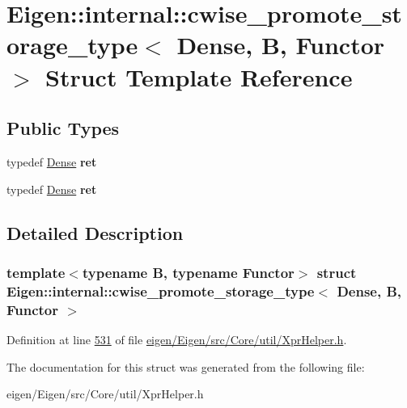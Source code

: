 \hypertarget{struct_eigen_1_1internal_1_1cwise__promote__storage__type_3_01_dense_00_01_b_00_01_functor_01_4}{}\section{Eigen\+:\+:internal\+:\+:cwise\+\_\+promote\+\_\+storage\+\_\+type$<$ Dense, B, Functor $>$ Struct Template Reference}
\label{struct_eigen_1_1internal_1_1cwise__promote__storage__type_3_01_dense_00_01_b_00_01_functor_01_4}
\subsection*{Public Types}
\begin{DoxyCompactItemize}
\item 
\mbox{\label{struct_eigen_1_1internal_1_1cwise__promote__storage__type_3_01_dense_00_01_b_00_01_functor_01_4_a52f753cb452c8c3fb80554a58de1abab}} 
typedef \hyperlink{struct_eigen_1_1_dense}{Dense} {\bfseries ret}
\item 
\mbox{\label{struct_eigen_1_1internal_1_1cwise__promote__storage__type_3_01_dense_00_01_b_00_01_functor_01_4_a52f753cb452c8c3fb80554a58de1abab}} 
typedef \hyperlink{struct_eigen_1_1_dense}{Dense} {\bfseries ret}
\end{DoxyCompactItemize}


\subsection{Detailed Description}
\subsubsection*{template$<$typename B, typename Functor$>$\newline
struct Eigen\+::internal\+::cwise\+\_\+promote\+\_\+storage\+\_\+type$<$ Dense, B, Functor $>$}



Definition at line \hyperlink{eigen_2_eigen_2src_2_core_2util_2_xpr_helper_8h_source_l00531}{531} of file \hyperlink{eigen_2_eigen_2src_2_core_2util_2_xpr_helper_8h_source}{eigen/\+Eigen/src/\+Core/util/\+Xpr\+Helper.\+h}.



The documentation for this struct was generated from the following file\+:\begin{DoxyCompactItemize}
\item 
eigen/\+Eigen/src/\+Core/util/\+Xpr\+Helper.\+h\end{DoxyCompactItemize}
